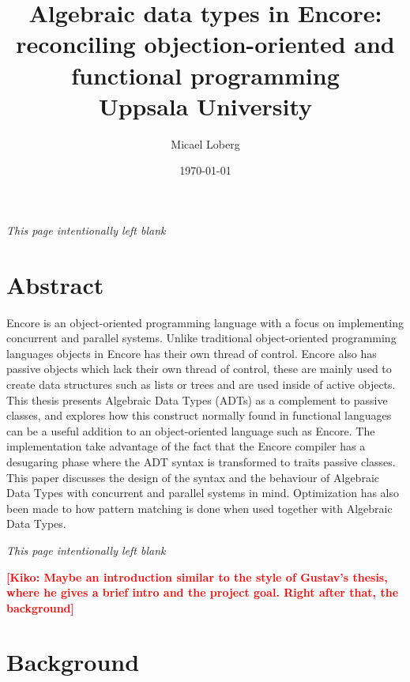 \documentclass[10pt]{report}
\title{
    {Algebraic data types in Encore:}\\
    {reconciling objection-oriented and functional programming}\\
    {Uppsala University}
}
\author{Micael Loberg}
\date{\today}
\newcommand{\KIKO}[1]{\textcolor{red}{\textbf{[Kiko: #1]}}}
\begin{document}

\maketitle

\newpage\newpage
{\centering \textit{This page intentionally left blank}\par}
\vspace{\fill}


\chapter*{Abstract}
\par{Encore is an object-oriented programming language with a focus on implementing concurrent and parallel systems. Unlike traditional object-oriented programming languages objects in Encore has their own thread of control. Encore also has passive objects which lack their own thread of control, these are mainly used to create data structures such as lists or trees and are used inside of active objects. This thesis presents Algebraic Data Types (ADTs) as a complement to passive classes, and explores how this construct normally found in functional languages can be a useful addition to an object-oriented language such as Encore. The implementation take advantage of the fact that the Encore compiler has a desugaring phase where the ADT syntax is transformed to traits passive classes. This paper discusses the design of the syntax and the behaviour of Algebraic Data Types with concurrent and parallel systems in mind. Optimization has also been made to how pattern matching is done when used together with Algebraic Data Types.}

\newpage\newpage
{\centering \textit{This page intentionally left blank}\par}
\vspace{\fill}


\tableofcontents

\KIKO{Maybe an introduction similar to the style of Gustav's thesis, where
he gives a brief intro and the project goal. Right after that, the background}

%
\chapter{Background}
%
\setcounter{page}{1}
\end{document}
